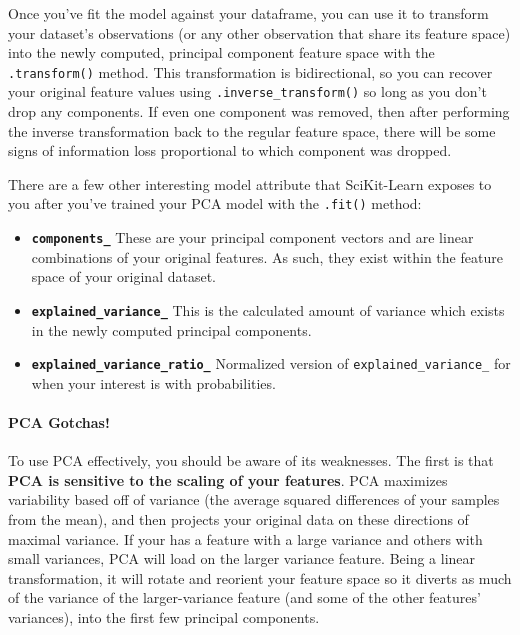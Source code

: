 \documentclass[11pt]{article}
\providecommand{\tightlist}{%
      \setlength{\itemsep}{0pt}\setlength{\parskip}{0pt}}
\begin{document}
    Once you've fit the model against your dataframe, you can use it to
transform your dataset's observations (or any other observation that
share its feature space) into the newly computed, principal component
feature space with the \texttt{.transform()} method. This transformation
is bidirectional, so you can recover your original feature values using
\texttt{.inverse\_transform()} so long as you don't drop any components.
If even one component was removed, then after performing the inverse
transformation back to the regular feature space, there will be some
signs of information loss proportional to which component was dropped.

There are a few other interesting model attribute that SciKit-Learn
exposes to you after you've trained your PCA model with the
\texttt{.fit()} method:

\begin{itemize}
\tightlist
\item
  \textbf{\texttt{components\_}} These are your principal component
  vectors and are linear combinations of your original features. As
  such, they exist within the feature space of your original dataset.
\item
  \textbf{\texttt{explained\_variance\_}} This is the calculated amount
  of variance which exists in the newly computed principal components.
\item
  \textbf{\texttt{explained\_variance\_ratio\_}} Normalized version of
  \texttt{explained\_variance\_} for when your interest is with
  probabilities.
\end{itemize}

\paragraph{PCA Gotchas!}\label{pca-gotchas}

To use PCA effectively, you should be aware of its weaknesses. The first
is that \textbf{PCA is sensitive to the scaling of your features}. PCA
maximizes variability based off of variance (the average squared
differences of your samples from the mean), and then projects your
original data on these directions of maximal variance. If your has a
feature with a large variance and others with small variances, PCA will
load on the larger variance feature. Being a linear transformation, it
will rotate and reorient your feature space so it diverts as much of the
variance of the larger-variance feature (and some of the other features'
variances), into the first few principal components.
\end{document}
